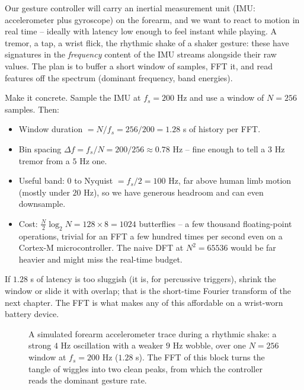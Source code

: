 \begin{goalbox}
Our gesture controller will carry an inertial measurement unit (IMU: accelerometer plus
gyroscope) on the forearm, and we want to react to motion in real time -- ideally with
latency low enough to feel instant while playing. A tremor, a tap, a wrist flick, the
rhythmic shake of a shaker gesture: these have signatures in the \emph{frequency} content
of the IMU streams alongside their raw values. The plan is to buffer a short window of
samples, FFT it, and read features off the spectrum (dominant frequency, band energies).

Make it concrete. Sample the IMU at $f_s = 200$ Hz and use a window of $N = 256$ samples.
Then:
\begin{itemize}
\item Window duration $= N/f_s = 256/200 = 1.28$ s of history per FFT.
\item Bin spacing $\Delta f = f_s/N = 200/256 \approx 0.78$ Hz -- fine enough to tell a
$3$ Hz tremor from a $5$ Hz one.
\item Useful band: $0$ to Nyquist $= f_s/2 = 100$ Hz, far above human limb motion (mostly
under $20$ Hz), so we have generous headroom and can even downsample.
\item Cost: $\tfrac{N}{2}\log_2 N = 128 \times 8 = 1024$ butterflies -- a few thousand
floating-point operations, trivial for an FFT a few hundred times per second even on a
Cortex-M microcontroller. The naive DFT at $N^2 = 65536$ would be far heavier and might
miss the real-time budget.
\end{itemize}
If $1.28$ s of latency is too sluggish (it is, for percussive triggers), shrink the
window or slide it with overlap; that is the short-time Fourier transform of the next
chapter. The FFT is what makes any of this affordable on a wrist-worn battery device.
\end{goalbox}

\begin{figure}[H]
\centering
{}
\caption{A simulated forearm accelerometer trace during a rhythmic shake: a strong $4$ Hz
oscillation with a weaker $9$ Hz wobble, over one $N=256$ window at $f_s=200$ Hz
($1.28$ s). The FFT of this block turns the tangle of wiggles into two clean peaks, from
which the controller reads the dominant gesture rate.}
\label{ch09:fig-imu}
\end{figure}

